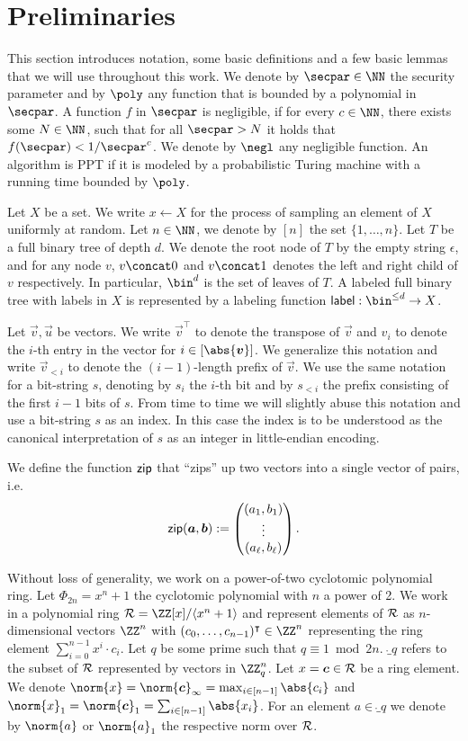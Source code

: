 \section{Preliminaries}\label{sec:prelim}
This section introduces notation, some basic definitions and a few basic lemmas that we will use throughout this work.
We denote by $\secpar\in\NN$ the security parameter and by $\poly$ any function that is bounded by a polynomial in $\secpar$.
A function $f$ in $\secpar$ is negligible, if for every $c \in \NN$, there exists some $N\in\NN$, such that for all $\secpar>N$ it holds that $f(\secpar) < 1/\secpar^c$.
We denote by $\negl$ any negligible function.
An algorithm is PPT if it is modeled by a probabilistic Turing machine with a running time bounded by $\poly$.

Let $X$ be a set.
We write $x\gets X$ for the process of sampling an element of $X$ uniformly at random.
Let $n\in\NN$, we denote by $[n]$ the set $\{1,\dots,n\}$.
Let $T$ be a full binary tree of depth $d$.
We denote the root node of $T$ by the empty string $\epsilon$, and for any node $v$, $v\concat 0$ and $v\concat 1$ denotes the left and right child of $v$ respectively.
In particular, $\bin^d$ is the set of leaves of $T$.
A labeled full binary tree with labels in $X$ is represented by a labeling function $\lbl : \bin^{\leq d} \to X$.

Let $\vec{v},\vec{u}$ be vectors.
We write $\vec{v}^\intercal$ to denote the transpose of $\vec{v}$ and $v_i$ to denote the $i$-th entry in the vector for $i\in[\abs{\vec{v}}]$.
We generalize this notation and write $\vec{v}_{< i}$ to denote the $(i-1)$-length prefix of $\vec{v}$.
We use the same notation for a bit-string $s$, denoting by $s_i$ the $i$-th bit and by $s_{<i}$ the prefix consisting of the first $i-1$ bits of $s$.
From time to time we will slightly abuse this notation and use a bit-string $s$ as an index.
In this case the index is to be understood as the canonical interpretation of $s$ as an integer in little-endian encoding.

We define the function $\mathsf{zip}$ that \enquote{zips} up two vectors into a single vector of pairs, i.e.
\[\mathsf{zip}(\boldsymbol{a},\boldsymbol{b}) := \begin{pmatrix}(a_1,b_1)\\
\vdots\\
(a_\ell,b_\ell) \end{pmatrix}.\]

Without loss of generality, we work on a power-of-two cyclotomic polynomial ring.
Let $\Phi_{2n} = x^n+1$ the cyclotomic polynomial with $n$ a power of 2. 
 We work in a polynomial ring $\ring =  \ZZ[x]/\langle x^n+1\rangle$ and represent elements of $\mathcal{R}$ as $n$-dimensional vectors $\ZZ^n$ with $(c_0,\dots,c_{n-1})^\intercal\in \ZZ^n$ representing the ring element $\sum_{i=0}^{n-1} x^i \cdot c_i$.
Let $q$  be some prime such that $q \equiv 1 \bmod 2n$.
$\ring_q$ refers to the subset of $\mathcal{R}$ represented by vectors in $\ZZ_q^n$.
Let $x = \boldsymbol{c} \in \mathcal{R}$ be a ring element. We denote $\norm{x} = \norm{\vec{c}}_\infty = \max_{i\in[n-1]}\abs{c_i}$ and $\norm{x}_1 = \norm{\vec{c}}_1 = \sum_{i\in[n-1]}\abs{x_i}$.
For an element $a\in\ring_q$ we denote by $\norm{a}$ or $\norm{a}_1$ the respective norm over $\mathcal{R}$.

